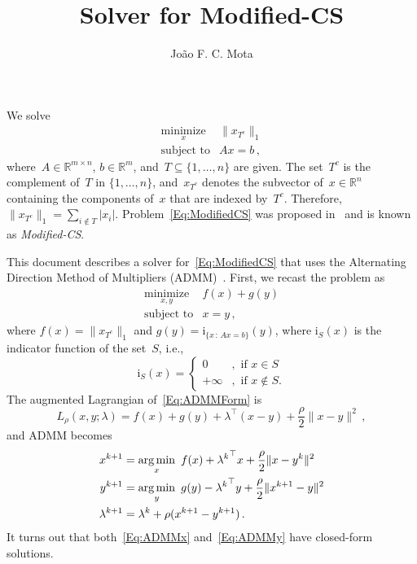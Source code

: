 \documentclass[letter,10pt]{article}
\title{Solver for Modified-CS}
\author{Jo\~ao F. C. Mota}
\theoremstyle{definition}
\theoremstyle{nonumberplain}
\begin{document}
\maketitle

	We solve
	\begin{equation}\label{Eq:ModifiedCS}
		\begin{array}{ll}
			\underset{x}{\text{minimize}} & \|x_{T^c}\|_1 \\
			\text{subject to} & Ax = b\,,
		\end{array}
	\end{equation}
	where~$A \in \mathbb{R}^{m \times n}$, $b \in \mathbb{R}^m$, and~$T \subseteq \{1,\ldots,n\}$ are given. The set~$T^c$ is the complement of~$T$ in $\{1,\ldots,n\}$, and~$x_{T^c}$ denotes the subvector of~$x \in \mathbb{R}^n$ containing the components of~$x$ that are indexed by~$T^c$. Therefore, $\|x_{T^c}\|_1 = \sum_{i \not \in T}|x_i|$. Problem~\eqref{Eq:ModifiedCS} was proposed in~\cite{Vaswani10-ModifiedCS} and is known as \textit{Modified-CS}.
	
	This document describes a solver for~\eqref{Eq:ModifiedCS} that uses the Alternating Direction Method of Multipliers (ADMM)~\cite{Glowinski75-ADMM,Gabay76-ADMM,Boyd11-ADMM}. First, we recast the problem as
	\begin{equation}\label{Eq:ADMMForm}
		\begin{array}{ll}
			\underset{x,y}{\text{minimize}} & f(x) + g(y) \\
			\text{subject to} & x = y\,,
		\end{array}
	\end{equation}
	where $f(x) = \|x_{T^c}\|_1$ and $g(y) = \text{i}_{\{x\,:\, Ax = b\}}(y)$, where $\text{i}_S(x)$ is the indicator function of the set~$S$, i.e.,
	$$
		\text{i}_S(x) = \left\{
											\begin{array}{ll}
												0 &,\,\,\text{if $x \in S$} \\
												+\infty &,\,\, \text{if $x \not\in S$}.
											\end{array}
										\right.
	$$
	The augmented Lagrangian of~\eqref{Eq:ADMMForm} is
	$$
		L_\rho (x,y;\lambda) = f(x) + g(y) + \lambda^\top (x - y) + \frac{\rho}{2} \|x - y\|^2\,,
	$$
	and ADMM becomes
	\begin{align}
		x^{k+1} &= \underset{x}{\arg\min}\,\,\, f(x) + {\lambda^k}^\top x +\frac{\rho}{2}\|x - y^k\|^2
		\label{Eq:ADMMx}
		\\
		y^{k+1} &= \underset{y}{\arg\min}\,\,\, g(y) - {\lambda^k}^\top y +\frac{\rho}{2}\|x^{k+1} - y\|^2
		\label{Eq:ADMMy}
		\\
		\lambda^{k+1} &= \lambda^k + \rho (x^{k+1} - y^{k+1})\,.
		\notag
	\end{align}
	It turns out that both~\eqref{Eq:ADMMx} and~\eqref{Eq:ADMMy} have closed-form solutions.
\end{document}
